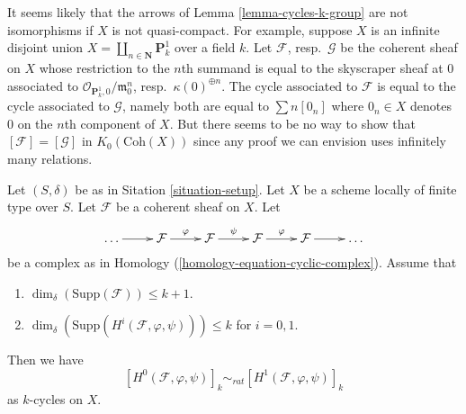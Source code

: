 \begin{remark}
\label{remark-not-true-not-quasi-compact}
It seems likely that the arrows of Lemma \ref{lemma-cycles-k-group}
are not isomorphisms if $X$ is not quasi-compact. For example, suppose $X$ is
an infinite disjoint union $X = \coprod_{n \in \mathbf{N}} \mathbf{P}^1_k$
over a field $k$. Let $\mathcal{F}$, resp.\ $\mathcal{G}$ be the coherent
sheaf on $X$ whose restriction to the $n$th summand is equal to the skyscraper
sheaf at $0$ associated to $\mathcal{O}_{\mathbf{P}^1_k, 0}/\mathfrak m_0^n$,
resp.\ $\kappa(0)^{\oplus n}$. The cycle associated to $\mathcal{F}$ is
equal to the cycle associated to $\mathcal{G}$, namely both are equal to
$\sum n[0_n]$ where $0_n \in X$ denotes $0$ on the $n$th component of $X$.
But there seems to be no way to show that
$[\mathcal{F}] = [\mathcal{G}]$ in $K_0(\text{Coh}(X))$ since
any proof we can envision uses infinitely many relations.
\end{remark}

\begin{lemma}
\label{lemma-maps-between-coherent-sheaves}
Let $(S, \delta)$ be as in Sitation \ref{situation-setup}.
Let $X$ be a scheme locally of finite type over $S$.
Let $\mathcal{F}$ be a coherent sheaf on $X$.
Let 
$$
\xymatrix{
\ldots \ar[r] &
\mathcal{F} \ar[r]^\varphi &
\mathcal{F} \ar[r]^\psi &
\mathcal{F} \ar[r]^\varphi &
\mathcal{F} \ar[r] & \ldots
}
$$
be a complex as in Homology (\ref{homology-equation-cyclic-complex}).
Assume that
\begin{enumerate}
\item $\dim_\delta(\text{Supp}(\mathcal{F})) \leq k + 1$.
\item $\dim_\delta(\text{Supp}(H^i(\mathcal{F}, \varphi, \psi))) \leq k$
for $i = 0, 1$.
\end{enumerate}
Then we have
$$
[H^0(\mathcal{F}, \varphi, \psi)]_k
\sim_{rat}
[H^1(\mathcal{F}, \varphi, \psi)]_k
$$
as $k$-cycles on $X$.
\end{lemma}

